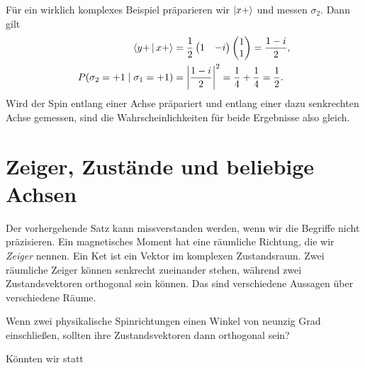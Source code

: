 Für ein wirklich komplexes Beispiel präparieren wir \(\left\lvert x+\right\rangle\) und messen \(\sigma_2\). Dann gilt
\begin{align}
  \left\langle y+\,\middle|\,x+\right\rangle
  &=
  \frac12
  \begin{pmatrix}1&-i\end{pmatrix}
  \begin{pmatrix}1\\1\end{pmatrix}
  =\frac{1-i}{2},
  \notag\\
  P(\sigma_2=+1\mid\sigma_1=+1)
  &=\left|\frac{1-i}{2}\right|^2
  =\frac14+\frac14
  =\frac12.
  \label{eq:l03-complex-probability-example}
\end{align}
Wird der Spin entlang einer Achse präpariert und entlang einer dazu senkrechten Achse gemessen, sind die Wahrscheinlichkeiten für beide Ergebnisse also gleich.

\section{Zeiger, Zustände und beliebige Achsen}

Der vorhergehende Satz kann missverstanden werden, wenn wir die Begriffe nicht präzisieren. Ein magnetisches Moment hat eine räumliche Richtung, die wir \emph{Zeiger} nennen. Ein Ket ist ein Vektor im komplexen Zustandsraum. Zwei räumliche Zeiger können senkrecht zueinander stehen, während zwei Zustandsvektoren orthogonal sein können. Das sind verschiedene Aussagen über verschiedene Räume.

\begin{classroomqa}
Wenn zwei physikalische Spinrichtungen einen Winkel von neunzig Grad einschließen, sollten ihre Zustandsvektoren dann orthogonal sein?\audiencequestion{}
\end{classroomqa}

\begin{classroomqa}
Könnten wir statt 
\end{classroomqa}

